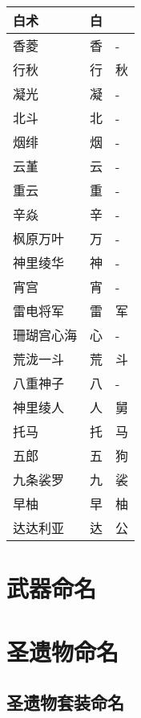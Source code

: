 \begin{longtabu}{|X[2c]|X[c]|X[c]|}
	{白术} & {白} & {} \\
	\hline
	{香菱} & {香} & {-} \\
	{行秋} & {行} & {秋} \\
	{凝光} & {凝} & {-} \\
	{北斗} & {北} & {-} \\
	{烟绯} & {烟} & {-} \\
	{云堇} & {云} & {-} \\
	{重云} & {重} & {-} \\
	{辛焱} & {辛} & {-} \\
	\hline
	{枫原万叶} & {万} & {-} \\
	{神里绫华} & {神} & {-} \\
	{宵宫} & {宵} & {-} \\
	{雷电将军} & {雷} & {军} \\
	{珊瑚宫心海} & {心} & {-} \\
	{荒泷一斗} & {荒} & {斗} \\
	{八重神子} & {八} & {-} \\
	{神里绫人} & {人} & {舅} \\
	\hline
	{托马} & {托} & {马} \\
	{五郎} & {五} & {狗} \\
	{九条裟罗} & {九} & {裟} \\
	{早柚} & {早} & {柚} \\
	\hline
	{达达利亚} & {达} & {公} \\
\end{longtabu}




\section{武器命名}



\section{圣遗物命名}

\subsection{圣遗物套装命名}

